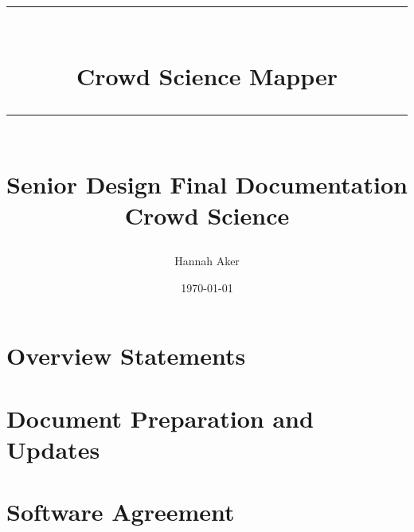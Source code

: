 \documentclass{book}
\title{{\color{SDColor3} \rule{\linewidth}{0.5mm}}\\[2mm] {\huge \bfseries \color{SDColor3} Crowd Science Mapper }\\[-1mm] {\color{SDColor3}\rule{\linewidth}{0.5mm}} \\  \vfill
{\LARGE \bfseries \color{SDColor4} Senior Design Final Documentation }\\  \vfill 
{\color{SDColor3} Crowd Science} }
\author{\color{SDColor3}  Hannah Aker}
\date{\color{SDColor3} \today}
\begin{document}
\frontmatter

\maketitle
\tableofcontents
{}
\listoffigures
{}

\chapter{Overview Statements}

\chapter{Document Preparation and Updates}

 
\mainmatter






\agreement

\chapter{Software Agreement}

\end{document}
